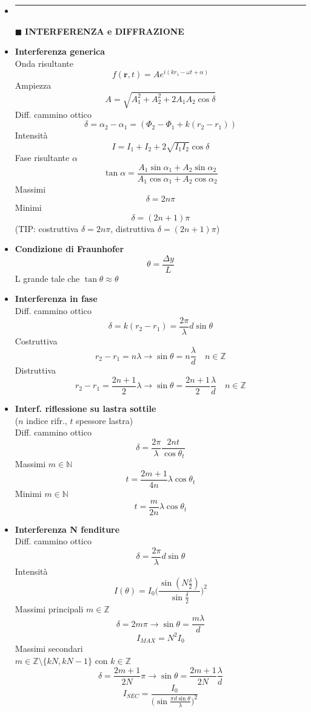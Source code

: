 \documentclass{book}
\newcommand{\g}{\textbf}
\newcommand{\h}{\mathbf}
\newcommand{\e}{\begin{equation}}
\newcommand{\ex}{\end{equation} }
\renewcommand{\it}{\item[$\cdot$]}
\newcommand{\sep}{\item[]\rule{\linewidth}{0.4pt}}
\begin{document}
\begin{multicols}{4}
\begin{itemize}
\sep
\item [$\blacksquare$] \g{INTERFERENZA e DIFFRAZIONE}  
    \it \g{Interferenza generica} \\
        Onda risultante
        \e{f(\h{r},t)=Ae^{i(kr_1-\omega t+\alpha)}} \ex
        Ampiezza
        \e{A=\sqrt{A_1^2+A_2^2+2A_1A_2\cos\delta}} \ex
        Diff. cammino ottico
        \e{\delta=\alpha_2-\alpha_1=(\Phi_2-\Phi_1+k(r_2-r_1))} \ex
        Intensità
        \e{I=I_1+I_2+2\sqrt{I_1I_2}\cos{\delta}} \ex
        Fase risultante $\alpha$
        \e{\tan\alpha=\frac{A_1\sin{\alpha_1}+A_2\sin{\alpha_2}}{A_1\cos{\alpha_1}+A_2\cos{\alpha_2}}} \ex
        Massimi
        \e{\delta=2n\pi} \ex
        Minimi
        \e{\delta=(2n+1)\pi } \ex
        (TIP: costruttiva $\delta=2n\pi$, distruttiva $\delta=(2n+1)\pi$)
    \it \g{Condizione di Fraunhofer} \\
        \e{\theta=\frac{\Delta y}{L}} \ex
        L grande tale che $\tan\theta\approx\theta$     
    \it \g{Interferenza in fase} \\
        Diff. cammino ottico
        \e{\delta=k(r_2-r_1)=\frac{2\pi}{\lambda}d\sin{\theta}} \ex
        Costruttiva
        \e{r_2-r_1=n\lambda \rightarrow \sin{\theta}=n\frac{\lambda}{d} \quad n\in\mathbb{Z}} \ex
        Distruttiva
        \e{r_2-r_1=\frac{2n+1}{2}\lambda \rightarrow \sin{\theta}=\frac{2n+1}{2}\frac{\lambda}{d} \quad n\in\mathbb{Z}} \ex
    \it \g{Interf. riflessione su lastra sottile} \\
        ($n$ indice rifr., $t$ spessore lastra) \\
        Diff. cammino ottico
        \e{\delta=\frac{2\pi}{\lambda}\frac{2nt}{\cos\theta_t}} \ex
        Massimi $m\in\mathbb{N}$
        \e{t=\frac{2m+1}{4n}\lambda\cos\theta_t}\ex
        Minimi $m\in\mathbb{N}$
        \e{t=\frac{m}{2n}\lambda\cos\theta_t}\ex
    \it \g{Interferenza N fenditure} \\
        Diff. cammino ottico
        \e{\delta=\frac{2\pi}{\lambda}d\sin{\theta}} \ex
        Intensità
        \e{I(\theta)=I_0\biggl(\frac{\sin(N\frac{\delta}{2})}{\sin\frac{\delta}{2}}\biggr)^2} \ex
        Massimi principali $m\in\mathbb{Z}$
        \e{\delta=2m\pi \rightarrow \sin\theta=\frac{m\lambda}{d}} \ex
        \e{I_{MAX}=N^2I_0} \ex
        Massimi secondari \\
        $m\in\mathbb{Z}\setminus\{kN,kN-1\}$ con $k\in\mathbb{Z}$
        \e{\delta=\frac{2m+1}{2N}\pi \rightarrow \sin\theta=\frac{2m+1}{2N}\frac{\lambda}{d}} \ex
        \e{I_{SEC}=\frac{I_0}{\bigl(\sin\frac{\pi d \sin\theta}{\lambda} \bigr)^2}} \ex

\end{itemize}
\end{multicols}
\end{document}
